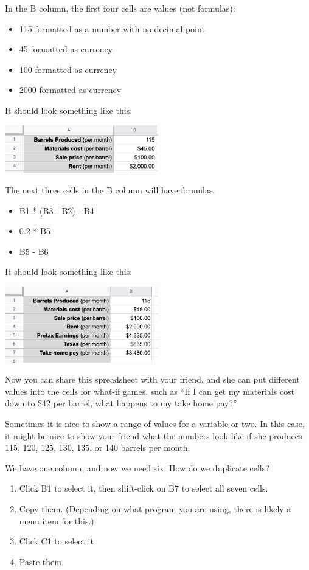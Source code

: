 In the B column, the first four cells are values (not formulas):
\begin{itemize}
\item{115 formatted as a number with no decimal point}
\item{45 formatted as currency}
\item{100 formatted as currency}
\item{2000 formatted as currency}
\end{itemize}

It should look something like this:

\includegraphics[width=0.5\textwidth]{BarrelValues.png}

The next three cells in the B column will have formulas:
\begin{itemize}
\item{B1 * (B3 - B2) - B4}
\item{0.2 * B5}
\item{B5 - B6}
\end{itemize}

It should look something like this:

\includegraphics[width=0.5\textwidth]{BarrelFormulas.png}

Now you can share this spreadsheet with your friend, and she can put
different values into the cells for what-if games, such as ``If I can
get my materials cost down to \$42 per barrel, what happens to my take
home pay?''

Sometimes it is nice to show a range of values for a variable or two.
In this case, it might be nice to show your friend what the numbers
look like if she produces 115, 120, 125, 130, 135, or 140 barrels per
month.

We have one column, and now we need six. How do we duplicate cells?
\begin{enumerate}
\item Click B1 to select it, then shift-click on B7 to select all seven cells.
\item Copy them. (Depending on what program you are using, there is likely a menu item for this.)
\item Click C1 to select it
\item Paste them.
\end{enumerate}

